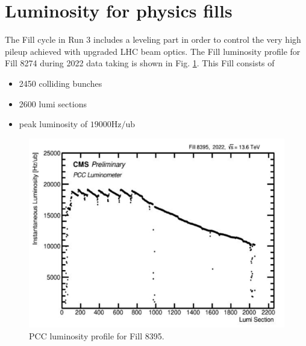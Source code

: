\newpage
\section{Luminosity for physics fills}

The Fill cycle in Run 3 includes a leveling part in order to control the very high pileup achieved with upgraded LHC beam optics. The Fill luminosity profile for Fill 8274 during 2022 data taking is shown in Fig. \ref{fig:period_bound_111}. This Fill consists of

\begin{itemize}
  
\item 2450 colliding bunches

\item 2600 lumi sections

\item peak luminosity of $19000 \text{Hz} / \text{ub}$


\end{itemize}

\begin{figure}[H]
\centering
\includegraphics[width=1\textwidth]{ashish_thesis/Fill_profile_8274_1.png}
\caption[Fill 8274 Luminosity Profile]{%
  PCC luminosity profile for Fill 8395.
}
\label{fig:period_bound_111}
\end{figure}

